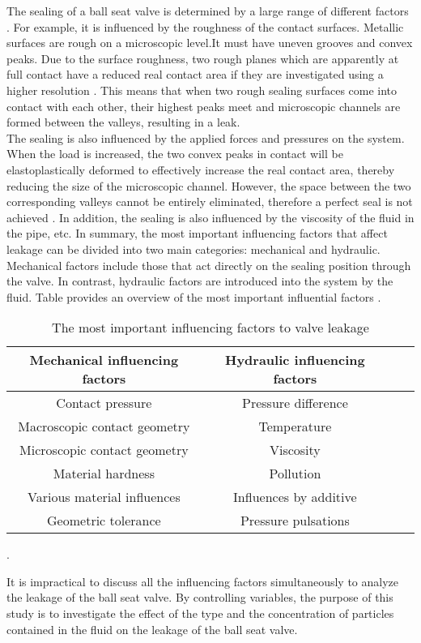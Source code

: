 The sealing of a ball seat valve is determined by a large range of different factors \cite{fischer2021influence}.
For example, it is influenced by the roughness of the contact surfaces. Metallic surfaces are rough 
on a microscopic level.It must have uneven grooves and convex peaks. Due to the surface roughness, two rough 
planes which are apparently at full contact have a reduced real contact area if they 
are investigated using a higher resolution \cite{fischer2021geometry}. This means that when two 
rough sealing surfaces come into contact with each other,
 their highest peaks meet and microscopic channels are formed between the valleys, resulting in a leak.\\

 The sealing is also influenced by the applied forces and pressures on the system. When the load is increased,
  the two convex peaks in contact will be elastoplastically deformed to effectively increase the real contact area, 
  thereby reducing the size of the microscopic channel. However, the space between 
 the two corresponding valleys cannot be entirely eliminated, therefore a perfect seal is not achieved \cite{Sealing2}.
 In addition, the sealing is also influenced by the viscosity of the fluid in the pipe, etc. 
 In summary, the most important influencing factors that affect leakage can be divided into two main 
 categories: mechanical and hydraulic. Mechanical factors include those that act directly on the sealing 
 position through the valve. In contrast, hydraulic factors are introduced into 
 the system by the fluid. Table  provides an overview of the most 
 important influential factors \cite{PhD-M.S}.


    \begin{table}[h!]
        \centering
        \begin{tabular}{|c| c |c |c|} 
         \hline
         Mechanical influencing factors & Hydraulic influencing factors  \\ [0.5ex] 
         \hline
         Contact pressure  & Pressure difference  \\ 
         Macroscopic contact geometry & Temperature  \\
         Microscopic contact geometry & Viscosity \\
         Material hardness & Pollution \\
         Various material influences & Influences by additive \\
         Geometric tolerance & Pressure pulsations\\[1ex] 
         \hline
        \end{tabular}
        \caption{The most important influencing factors to valve leakage \cite{PhD-M.S}}.
        \label{tab:influencing factors to valve}
        \end{table}

        It is impractical to discuss all the influencing factors simultaneously to analyze 
        the leakage of the ball seat valve. By controlling variables, the purpose of this study
         is to investigate the effect of the type and the 
        concentration of particles contained in the fluid on the leakage of the ball seat valve.